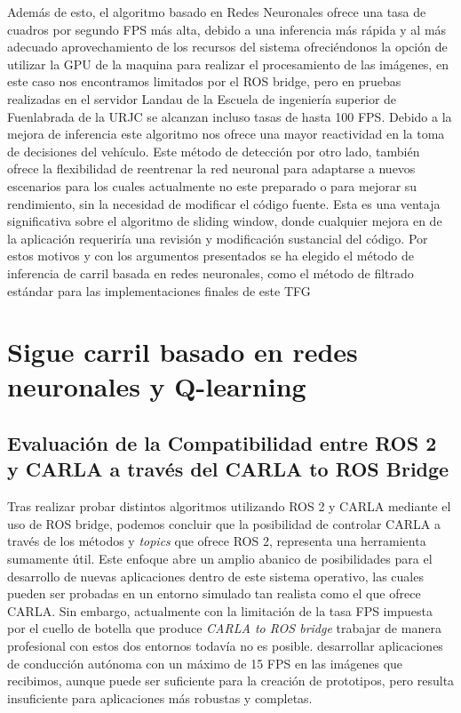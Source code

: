 Además de esto, el algoritmo basado en Redes Neuronales ofrece una tasa de cuadros por segundo \ac{FPS} más alta, debido a una inferencia más rápida y al más adecuado aprovechamiento de los recursos del sistema ofreciéndonos la opción de utilizar la \ac{GPU} de la maquina para realizar el procesamiento de las imágenes, en este caso nos encontramos limitados por el ROS bridge, pero en pruebas realizadas en el servidor Landau de la Escuela de ingeniería superior de Fuenlabrada de la \ac{URJC} se alcanzan incluso tasas de hasta 100 \ac{FPS}. Debido a la mejora de inferencia este algoritmo nos ofrece una mayor reactividad en la toma de decisiones del vehículo. Este método de detección por otro lado, también ofrece la flexibilidad de reentrenar la red neuronal para adaptarse a nuevos escenarios para los cuales actualmente no este preparado o para mejorar su rendimiento, sin la necesidad de modificar el código fuente. Esta es una ventaja significativa sobre el algoritmo de sliding window, donde cualquier mejora en de la aplicación requeriría una revisión y modificación sustancial del código. Por estos motivos y con los argumentos presentados se ha elegido el método de inferencia de carril basada en redes neuronales, como el método de filtrado estándar para las implementaciones finales de este \ac{TFG}

\bigskip

\section{Sigue carril basado en redes neuronales y Q-learning}
\label{Sigue carriles basado en redes neuronales y Qlearnig}

\subsection{Evaluación de la Compatibilidad entre ROS 2 y CARLA a través del CARLA to ROS Bridge}
\label{Evaluación de la Compatibilidad entre ROS y CARLA a través de ROS Bridge}

Tras realizar probar distintos algoritmos utilizando ROS 2 y CARLA mediante el uso de ROS bridge, podemos concluir que la posibilidad de controlar CARLA a través de los métodos y \textit{topics} que ofrece ROS 2,  representa una herramienta sumamente útil. Este enfoque abre un amplio abanico de posibilidades para el desarrollo de nuevas aplicaciones dentro de este sistema operativo, las cuales pueden ser probadas en un entorno simulado tan realista como el que ofrece CARLA. Sin embargo, actualmente con la limitación de la tasa \ac{FPS} impuesta por el cuello de botella que produce \textit{CARLA to ROS bridge} trabajar de manera profesional con estos dos entornos todavía no es posible. desarrollar aplicaciones de conducción autónoma con un máximo de 15 \ac{FPS} en las imágenes que recibimos, aunque puede ser suficiente para la creación de prototipos, pero resulta insuficiente para aplicaciones más robustas y completas.

